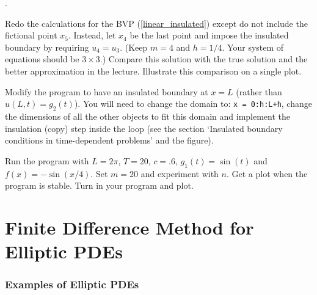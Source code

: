 \begin{list}
{.}{}

\item Redo the calculations for the BVP (\ref{linear_insulated}) except do not include
the fictional point $x_5$.  Instead, let $x_4$ be the last point and impose the insulated
boundary by requiring $u_4 = u_3$. (Keep $m=4$ and $h=1/4$. Your system of equations should be $3 \times 3$.)
Compare this solution with the true solution and the better approximation in the lecture.
Illustrate this comparison on a single plot.

\item Modify the program  to have an insulated boundary
  at $x=L$ (rather than $u(L,t) = g_2(t)$). You will need to change the domain to:
  \verb&x = 0:h:L+h&, change the dimensions of all the other objects to
  fit this domain and implement the insulation (copy) step inside the loop 
  (see the section `Insulated boundary conditions in time-dependent problems' and the
  figure). 
  
  Run the program with $L =
  2\pi$, $T=20$, $c = .6$, $g_1(t) = \sin(t)$ and $f(x) = -\sin(x/4)$.
  Set $m=20$ and experiment with $n$. Get a plot when the program is
  stable. Turn in your program and plot.

%

\end{list}






\chapter{Finite Difference Method for Elliptic PDEs}


\subsection*{Examples of Elliptic PDEs}

